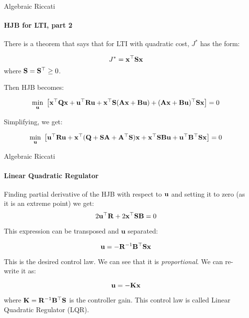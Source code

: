 \documentclass{beamer}
\begin{document}
\begin{frame}{Algebraic Riccati}
\framesubtitle{HJB for LTI, part 2}
\begin{flushleft}

There is a theorem that says that for LTI with quadratic cost, $J^*$ has the form:

\begin{equation}
J^* = \mathbf  x^\top \mathbf{S} \mathbf{x}
\end{equation}
%
where $\mathbf{S} = \mathbf{S}^\top \geq 0$.

\bigskip

Then HJB becomes:

\[
\underset{\bo{u}}{\min} \ 
\left [ 
\mathbf  x^\top \bo{Q} \bo{x} +
\mathbf  u^\top \bo{R} \bo{u}
+ 
\bo{x}^\top \bo{S}
(\bo{A} \bo{x} + \bo{B} \bo{u}) 
+ 
(\bo{A} \bo{x} + \bo{B} \bo{u})^\top
\bo{S} \bo{x}
\right ] = 0
\]

Simplifying, we get:

\[
\underset{\bo{u}}{\min} \ 
\left [ 
\bo{u}^\top \bo{R} \bo{u}
+ 
\bo{x}^\top (
\bo{Q} + \bo{S} \bo{A} + \bo{A}^\top \bo{S}
)\bo{x}
+ 
\bo{x}^\top \bo{S} \bo{B} \bo{u} 
+ \bo{u}^\top \bo{B}^\top \bo{S} \bo{x} 
\right ] = 0
\]

\end{flushleft}
\end{frame}


\begin{frame}{Algebraic Riccati}
\framesubtitle{Linear Quadratic Regulator}
\begin{flushleft}


Finding partial derivative of the HJB with respect to $\mathbf{u}$ and setting it to zero (as it is an extreme point) we get:
\begin{equation}
2 \mathbf  u^\top \mathbf{R} + 
2 \mathbf{x}^\top \mathbf{S} \mathbf{B} = 0
\end{equation}

This expression can be transposed and $\mathbf  u$ separated:

\begin{equation}
\mathbf  u = 
-\mathbf{R}^{-1} \mathbf{B}^\top \mathbf{S} \mathbf{x}
\end{equation}

This is the desired control law. We can see that it is \emph{proportional}. We can re-write it as:

\begin{equation}
\mathbf  u = -\mathbf K \mathbf{x}
\end{equation}

where $\mathbf K = \mathbf{R}^{-1} \mathbf{B}^\top \mathbf{S}$ is the controller gain. This control law is called Linear Quadratic Regulator (LQR).

\end{flushleft}
\end{frame}
\end{document}

